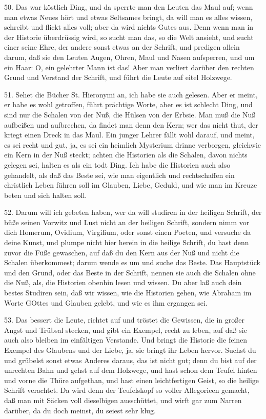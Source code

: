 50. Das war köstlich Ding, und da sperrte man den Leuten das Maul auf; wenn man etwas Neues hört und etwas Seltsames bringt, da will man es alles wissen, schreibt und flickt alles voll; aber da wird nichts Gutes aus. Denn wenn man in der Historie überdrüssig wird, so sucht man das, so die Welt ansieht, und sucht einer seine Ehre, der andere sonst etwas an der Schrift, und predigen allein darum, daß sie den Leuten Augen, Ohren, Maul und Nasen aufsperren, und um ein Haar: O, ein gelehrter Mann ist das! Aber man verliert darüber den rechten Grund und Verstand der Schrift, und führt die Leute auf eitel Holzwege.

51. Sehet die Bücher St. Hieronymi an, ich habe sie auch gelesen. Aber er meint, er habe es wohl getroffen, führt prächtige Worte, aber es ist schlecht Ding, und sind nur die Schalen von der Nuß, die Hülsen von der Erbsie. Man muß die Nuß aufbeißen und aufbrechen, da findet man denn den Kern; wer das nicht thut, der kriegt einen Dreck in das Maul. Ein junger Lehrer fällt wohl darauf, und meint, es sei recht und gut, ja, es sei ein heimlich Mysterium drinne verborgen, gleichwie ein Kern in der Nuß steckt; achten die Historien als die Schalen, davon nichts gelegen sei, halten es als ein todt Ding. Ich habe die Historien auch also gehandelt, als daß das Beste sei, wie man eigentlich und rechtschaffen ein christlich Leben führen soll im Glauben, Liebe, Geduld, und wie man im Kreuze beten und sich halten soll.

52. Darum will ich gebeten haben, wer da will studiren in der heiligen Schrift, der büße seinen Vorwitz und Lust nicht an der heiligen
Schrift, sondern nimm vor dich Homerum, Ovidium, Virgilium, oder sonst einen Poeten, und versuche da deine Kunst, und plumpe nicht hier herein in die heilige Schrift, du hast denn zuvor die Füße gewaschen, auf daß du den Kern aus der Nuß und nicht die Schalen überkommest; darum wende es um und suche das Beste. Das Hauptstück und den Grund, oder das Beste in der Schrift, nennen sie auch die Schalen ohne die Nuß, als, die Historien obenhin lesen und wissen. Du aber laß auch dein bestes Studiren sein, daß wir wissen, wie die Historien gehen, wie Abraham im Worte GOttes und Glauben gelebt, und wie es ihm ergangen sei.

53. Das bessert die Leute, richtet auf und tröstet die Gewissen, die in großer Angst und Trübsal stecken, und gibt ein Exempel, recht zu leben, auf daß sie auch also bleiben im einfältigen Verstande. Und bringt die Historie die feinen Exempel des Glaubens und der Liebe, ja, sie bringt ihr Leben hervor. Suchst du und grübelst sonst etwas Anderes daraus, das ist nicht gut; denn du bist auf der unrechten Bahn und gehst auf dem Holzwege, und hast schon dem Teufel hinten und vorne die Thüre aufgethan, und hast einen leichtfertigen Geist, so die heilige Schrift verachtet. Da wird denn der Teufelskopf so voller Allegorieen gemacht, daß man mit Säcken voll dieselbigen ausschüttet, und wirft gar zum Narren darüber, da du doch meinst, du seiest sehr klug.

